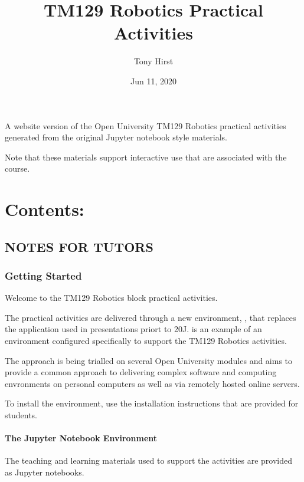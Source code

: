 \documentclass[letterpaper,10pt,english]{sphinxmanual}
\title{TM129 Robotics Practical Activities}
\date{Jun 11, 2020}
\author{Tony Hirst}
\begin{document}
\pagestyle{empty}
\sphinxmaketitle
\pagestyle{plain}
\sphinxtableofcontents
\pagestyle{normal}
\label{\detokenize{index::doc}}


A website version of the Open University TM129 Robotics practical activities generated
from the original Jupyter notebook style materials.

Note that these materials  support interactive use that are associated with the course.


\chapter{Contents:}
\label{\detokenize{index:contents}}

\section{NOTES FOR TUTORS}
\label{\detokenize{index:notes-for-tutors}}

\subsection{Getting Started}
\label{\detokenize{content/00_NOTES_FOR_TUTORS/GETTING_STARTED:Getting-Started}}\label{\detokenize{content/00_NOTES_FOR_TUTORS/GETTING_STARTED::doc}}
Welcome to the TM129 Robotics block practical activities.

The practical activities are delivered through a new environment, , that replaces the  application used in presentations priort to 20J.  is an example of an  environment configured specifically to support the TM129 Robotics activities.

The  approach is being trialled on several Open University modules and aims to provide a common approach to delivering complex software and computing envronments on personal computers as well as via remotely hosted online servers.

To install the environment, use the installation instructions that are provided for students.


\subsubsection{The Jupyter Notebook Environment}
\label{\detokenize{content/00_NOTES_FOR_TUTORS/GETTING_STARTED:The-Jupyter-Notebook-Environment}}
The teaching and learning materials used to support the activities are provided as Jupyter notebooks.
\end{document}

